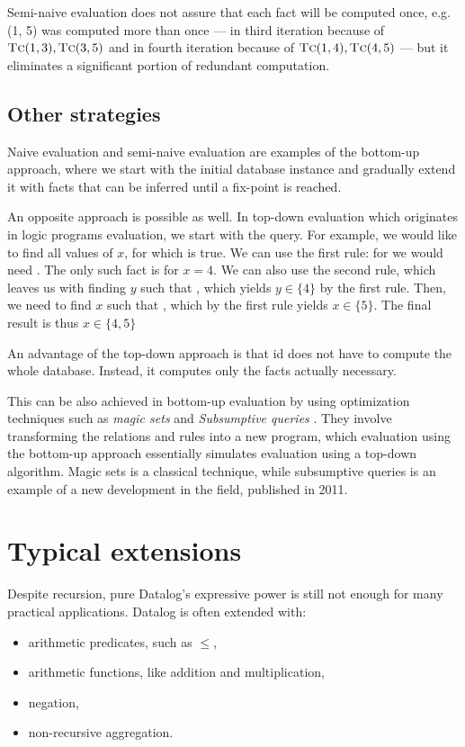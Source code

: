 Semi-naive evaluation does not assure that each fact will be computed once, e.g. (1, 5) was computed more than once --- in third iteration because of $\textsc{Tc}(1, 3), \textsc{Tc}(3, 5)$ and in fourth iteration because of $\textsc{Tc}(1, 4), \textsc{Tc}(4, 5)$ --- but it eliminates a significant portion of redundant computation.

\subsection{Other strategies}
Naive evaluation and semi-naive evaluation are examples of the bottom-up approach, where we start with the initial database instance and gradually extend it with facts that can be inferred until a fix-point is reached.

An opposite approach is possible as well. In top-down evaluation which originates in logic programs evaluation, we start with the query. For example, we would like to find all values of $x$, for which  is true. We can use the first rule: for  we would need . The only such fact is  for $x=4$. We can also use the second rule, which leaves us with finding $y$ such that , which yields $y \in \{4\}$ by the first rule. Then, we need to find $x$ such that , which by the first rule yields $x \in \{5\}$. The final result is thus $x \in \{4, 5\}$

An advantage of the top-down approach is that id does not have to compute the whole database. Instead, it computes only the facts actually necessary.

This can be also achieved in bottom-up evaluation by using optimization techniques such as \emph{magic sets} \cite{magicsets, fod} and \emph{Subsumptive queries} \cite{subsumptivequeries}. They involve transforming the relations and rules into a new program, which evaluation using the bottom-up approach essentially simulates evaluation using a top-down algorithm. Magic sets is a classical technique, while subsumptive queries is an example of a new development in the field, published in 2011.

\section{Typical extensions}
Despite recursion, pure Datalog's expressive power is still not enough for many practical applications. Datalog is often extended with:
\begin{itemize}
\item arithmetic predicates, such as $\le$,
\item arithmetic functions, like addition and multiplication,
\item negation,
\item non-recursive aggregation.
\end{itemize}

